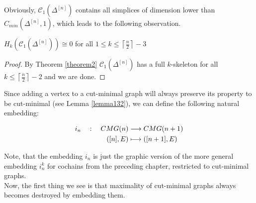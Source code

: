 Obviously, \(\mathcal{C}_1(\Delta^{[n]})\) contains all simplices of dimension lower than \(C_{min}(\Delta^{[n]},1)\), which leads to the following observation.

\begin{cor}
\(H_k(\mathcal{C}_1(\Delta^{[n]}))\cong 0\) for all \(1\leq k\leq\left\lceil\frac{n}{2}\right\rceil-3\)
\begin{proof}
By Theorem \ref{theorem2} \(\mathcal{C}_1(\Delta^{[n]})\) has a full \(k\)-skeleton for all \(k\leq\left\lceil\frac{n}{2}\right\rceil-2\) and we are done. 
\end{proof}
\end{cor}

Since adding a vertex to a cut-minimal graph will always preserve its property to be cut-minimal (see Lemma \ref{lemma132}), we can define the following natural embedding:

\begin{align}
i_n\quad :\quad CMG(n)&\longrightarrow CMG(n+1)\notag \\
([n],E)&\longmapsto ([n+1],E)\notag
\end{align}

Note, that the embedding \(i_n\) is just the graphic version of the more general embedding \(i_n^k\) for cochains from the preceding chapter, restricted to cut-minimal graphs.\\
Now, the first thing we see is that maximality of cut-minimal graphs always becomes destroyed by embedding them.

